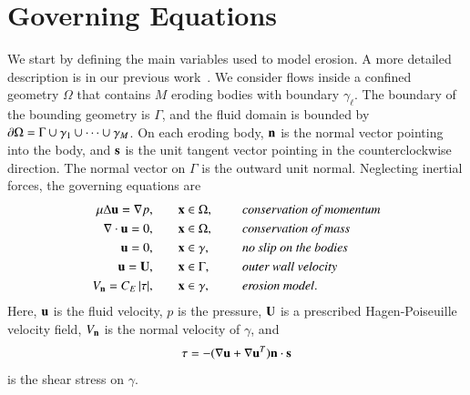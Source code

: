 \documentclass[preprint, 10pt]{elsarticle}
\begin{document}
\section{Governing Equations}
\label{s:formulation}
We start by defining the main variables used to model erosion.  A more
detailed description is in our previous work~\cite{qua-moo2018}.  We
consider flows inside a confined geometry $\Omega$ that contains $M$
eroding bodies with boundary $\gamma_\ell$.  The boundary of the
bounding geometry is $\Gamma$, and the fluid domain is bounded by $\bd
\Omega = \Gamma \cup \gamma_1 \cup \cdots \cup \gamma_M$.  On each
eroding body, $\nn$ is the normal vector pointing into the body, and
$\ss$ is the unit tangent vector pointing in the counterclockwise
direction.  The normal vector on $\Gamma$ is the outward unit normal.
Neglecting inertial forces, the governing equations are
\begin{equation}
\label{eqn:erosionModel}
  \begin{split}
    \mu \Delta \uu = \grad p, &\hspace{20pt} \xx \in \Omega, \gap 
      &&\mbox{\em conservation of momentum}\\
    \grad \cdot \uu = 0, &\hspace{20pt} \xx \in \Omega, \gap 
      &&\mbox{\em conservation of mass} \\
    \uu = 0, &\hspace{20pt} \xx \in \gamma, \gap 
      &&\mbox{\em no slip on the bodies} \\
    \uu = \UU, &\hspace{20pt} \xx \in \Gamma, \gap 
      &&\mbox{\em outer wall velocity} \\
    \Vn = \CE \, \abs{\tau}, &\hspace{20pt} \xx \in \gamma,
      &&\mbox{\em erosion model}.
  \end{split}
\end{equation}
Here, $\uu$ is the fluid velocity, $p$ is the pressure, $\UU$ is a
prescribed Hagen-Poiseuille velocity field, $\Vn$ is the normal velocity
of $\gamma$, and
\begin{align}
  \tau = -(\nabla \uu + \nabla \uu^T) \nn \cdot \ss
  \label{eqn:shearStress}
\end{align}
is the shear stress on $\gamma$.
\end{document}
